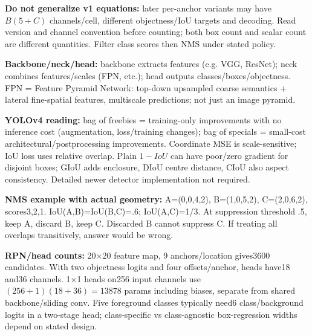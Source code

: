 \documentclass[a4paper]{article}
\newcommand{\key}[1]{\textbf{#1}}
\newcounter{sheet}
\newcounter{sheetcolumn}
\newlength{\colwidth}
\newenvironment{sheetcol}[1][7.0]{\stepcounter{sheetcolumn}
  \begin{lrbox}{\columnbox}\begin{minipage}[t]{\colwidth}\vspace{0pt}
  \fontsize{#1}{\dimexpr#1pt+0.6pt\relax}\selectfont}
  {\end{minipage}\end{lrbox}
  \typeout{CV1COL|\thesheet|\thesheetcolumn|\the\dimexpr\ht\columnbox+\dp\columnbox\relax}
  \usebox{\columnbox}\ignorespacesafterend}
\newcommand{\Sep}{\hfill}
\begin{document}
\begin{sheetcol}[6.7]
\key{Do not generalize v1 equations:} later per-anchor variants may have \(B(5+C)\) channels/cell, different objectness/IoU targets and decoding. Read version and channel convention before counting; both box count and scalar count are different quantities. Filter class scores then NMS under stated policy.

\key{Backbone/neck/head:} backbone extracts features (e.g. VGG, ResNet); neck combines features/scales (FPN, etc.); head outputs classes/boxes/objectness. FPN = Feature Pyramid Network: top-down upsampled coarse semantics + lateral fine-spatial features, multiscale predictions; not just an image pyramid.

\key{YOLOv4 reading:} bag of freebies = training-only improvements with no inference cost (augmentation, loss/training changes); bag of specials = small-cost architectural/postprocessing improvements. Coordinate MSE is scale-sensitive; IoU loss uses relative overlap. Plain \(1-IoU\) can have poor/zero gradient for disjoint boxes; GIoU adds enclosure, DIoU centre distance, CIoU also aspect consistency. Detailed newer detector implementation not required.

\key{NMS example with actual geometry:} A=(0,0,4,2), B=(1,0,5,2), C=(2,0,6,2), scores3,2,1. IoU(A,B)=IoU(B,C)=.6; IoU(A,C)=1/3. At suppression threshold .5, keep A, discard B, keep C. Discarded B cannot suppress C. If treating all overlaps transitively, answer would be wrong.

\key{RPN/head counts:} 20\(\times\)20 feature map, 9 anchors/location gives3600 candidates. With two objectness logits and four offsets/anchor, heads have18 and36 channels. 1\(\times\)1 heads on256 input channels use \((256+1)(18+36)=13878\) params including biases, separate from shared backbone/sliding conv. Five foreground classes typically need6 class/background logits in a two-stage head; class-specific vs class-agnostic box-regression widths depend on stated design.
\end{sheetcol}\Sep
\end{document}
